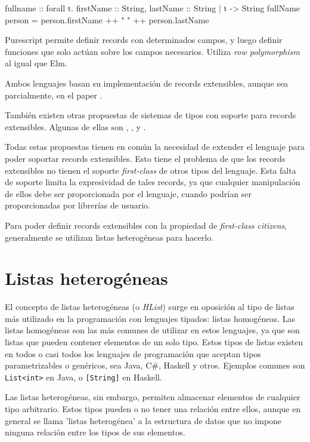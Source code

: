\begin{code}
fullname :: forall t. { firstName :: String, 
  lastName :: String | t } -> String 
fullName person = person.firstName ++ " " ++ person.lastName
\end{code}

Purescript permite definir records con determinados campos, y luego definir funciones que solo actúan sobre los campos necesarios. Utiliza \textit{row polymorphism} al igual que Elm.

Ambos lenguajes basan su implementación de records extensibles, aunque sea parcialmente, en el paper \cite{Leijen:scopedlabels}.

También existen otras propuestas de sistemas de tipos con soporte para records extensibles. Algunas de ellas son \cite{Leijen:fclabels}, \cite{Jeltsch:2010:GRC:1836089.1836108}, y \cite{Gaster96apolymorphic}.

Todas estas propuestas tienen en común la necesidad de extender el lenguaje para poder soportar records extensibles. Esto tiene el problema de que los records extensibles no tienen el soporte \textit{first-class} de otros tipos del lenguaje. Esta falta de soporte limita la expresividad de tales records, ya que cualquier manipulación de ellos debe ser proporcionada por el lenguaje, cuando podrían ser proporcionadas por librerías de usuario.

Para poder definir records extensibles con la propiedad de \textit{first-class citizens}, generalmente se utilizan listas heterogéneas para hacerlo.

\section{Listas heterogéneas}

El concepto de listas heterogéneas (o \textit{HList}) surge en oposición al tipo de listas más utilizado en la programación con lenguajes tipados: listas homogéneas. Las listas homogéneas son las más comunes de utilizar en estos lenguajes, ya que son listas que pueden contener elementos de un solo tipo.
Estos tipos de listas existen en todos o casi todos los lenguajes de programación que aceptan tipos parametrizables o genéricos, sea Java, C\#, Haskell y otros. Ejemplos comunes son \texttt{List<int>} en Java, o \texttt{[String]} en Haskell.

Las listas heterogéneas, sin embargo, permiten almacenar elementos de cualquier tipo arbitrario. Estos tipos pueden o no tener una relación entre ellos, aunque en general se llama 'listas heterogénea' a la estructura de datos que no impone ninguna relación entre los tipos de sus elementos.


